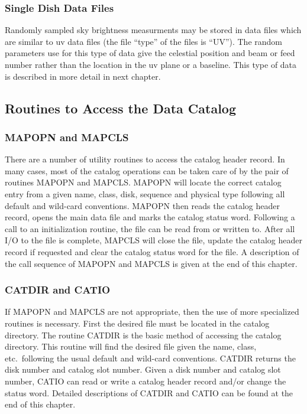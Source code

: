 \subsubsection{Single Dish Data Files}

   Randomly sampled sky brightness measurments may be stored in data
files which are similar to uv data files (the file ``type'' of the
files is ``UV'').  The random parameters use for this type of data give
the celestial position and beam or feed number rather than the
location in the uv plane or a baseline.  This type of data is
described in more detail in next chapter.

\subsection{Routines to Access the Data Catalog}
\subsubsection{MAPOPN and MAPCLS}
There are a number of utility routines to access the catalog header
record.  In many cases, most of the catalog operations can be taken
care of by the pair of routines MAPOPN and MAPCLS.  MAPOPN will
locate the correct catalog entry from a given name, class, disk,
sequence and physical type following all default and wild-card
conventions.  MAPOPN then reads the catalog header record, opens the
main data file and marks the catalog status word.  Following a call to
an initialization routine, the file can be read from or written to.
After all I/O to the file is complete, MAPCLS will close the file,
update the catalog header record if requested and clear the catalog
status word for the file.  A description of the call sequence of
MAPOPN and MAPCLS is given at the end of this chapter.

\subsubsection{CATDIR and CATIO}
If MAPOPN and MAPCLS are not appropriate, then the use of more
specialized routines is necessary.  First the desired file must be
located in the catalog directory.  The routine CATDIR is the basic
method of accessing the catalog directory.  This routine will find the
desired file given the name, class, etc.~following the usual default
and wild-card conventions.  CATDIR returns the disk number and catalog
slot number.  Given a disk number and catalog slot number, CATIO can
read or write a catalog header record and/or change the status word.
Detailed descriptions of CATDIR and CATIO can be found at the end of
this chapter.


